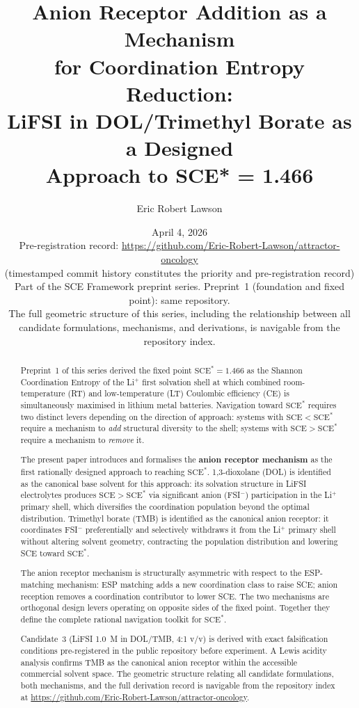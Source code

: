 \documentclass[11pt]{article}
\title{\textbf{Anion Receptor Addition as a Mechanism\\
for Coordination Entropy Reduction:\\
LiFSI in DOL/Trimethyl Borate as a Designed\\
Approach to SCE* = 1.466}}
\author[1]{Eric Robert Lawson}
\affil[1]{Independent Researcher, OrganismCore Initiative\\
\texttt{ORCID: 0009-0002-0414-6544}\\
Repository: \url{https://github.com/Eric-Robert-Lawson/attractor-oncology}}
\date{April 4, 2026\\
\small Pre-registration record:
\url{https://github.com/Eric-Robert-Lawson/attractor-oncology}\\
\small (timestamped commit history constitutes the priority
and pre-registration record)\\
\small Part of the SCE Framework preprint series.
Preprint~1 (foundation and fixed point):
same repository.\\
\small The full geometric structure of this series,
including the relationship between all candidate formulations,
mechanisms, and derivations, is navigable from the repository
index.}
\theoremstyle{plain}
\theoremstyle{definition}
\theoremstyle{remark}
\begin{document}
\maketitle

\begin{abstract}
Preprint~1 of this series derived the fixed point
$\mathrm{SCE}^{*} = 1.466$ as the Shannon Coordination Entropy of the
Li$^+$ first solvation shell at which combined room-temperature (RT) and
low-temperature (LT) Coulombic efficiency (CE) is simultaneously
maximised in lithium metal batteries.  Navigation toward
$\mathrm{SCE}^{*}$ requires two distinct levers depending on the
direction of approach: systems with $\mathrm{SCE} < \mathrm{SCE}^{*}$
require a mechanism to \emph{add} structural diversity to the shell;
systems with $\mathrm{SCE} > \mathrm{SCE}^{*}$ require a mechanism to
\emph{remove} it.

The present paper introduces and formalises the \textbf{anion receptor
mechanism} as the first rationally designed approach to reaching
$\mathrm{SCE}^{*}$.  1,3-dioxolane (DOL) is identified as
the canonical base solvent for this approach: its solvation structure in
LiFSI electrolytes produces $\mathrm{SCE} > \mathrm{SCE}^{*}$ via
significant anion (FSI$^-$) participation in the Li$^+$ primary shell,
which diversifies the coordination population beyond the optimal
distribution.  Trimethyl borate (TMB) is identified as the canonical
anion receptor: it coordinates FSI$^-$ preferentially and selectively
withdraws it from the Li$^+$ primary shell without altering solvent
geometry, contracting the population distribution and lowering SCE
toward $\mathrm{SCE}^{*}$.

The anion receptor mechanism is structurally asymmetric with respect to
the ESP-matching mechanism: ESP matching adds a new coordination class
to raise SCE; anion reception removes a coordination contributor to
lower SCE.  The two mechanisms are orthogonal design levers operating on
opposite sides of the fixed point.  Together they define the complete
rational navigation toolkit for $\mathrm{SCE}^{*}$.

Candidate~3 (LiFSI 1.0~M in DOL/TMB, 4:1 v/v) is derived with exact
falsification conditions pre-registered in the public repository before
experiment.  A Lewis acidity analysis confirms TMB as the canonical
anion receptor within the accessible commercial solvent space.  The
geometric structure relating all candidate formulations, both mechanisms,
and the full derivation record is navigable from the repository index at
\url{https://github.com/Eric-Robert-Lawson/attractor-oncology}.
\end{abstract}
\end{document}
